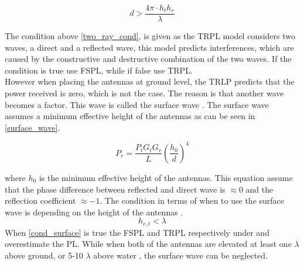 \begin{equation}
d > \frac{4\pi \cdot h_t h_r }{\lambda}
\label{two_ray_cond}
\end{equation}
 

The condition above \eqref{two_ray_cond}, is given as the TRPL model considers two waves, a direct and a reflected wave, this model predicts interferences, which are caused by the constructive and destructive combination of the two waves. If the condition is true use FSPL, while if false use TRPL.   %
\\










However when placing the antennas at ground level, the TRLP predicts that the power received is zero, which is not the case.
The reason is that another wave becomes a factor. This wave is called the surface wave \cite{Chong}. The surface wave assumes a minimum effective height of the antennas as can be seen in \eqref{surface_wave}. 

\begin{equation}
P_r=\frac{P_t G_t G_r }{L}\left(\frac{h_0}{d}\right)^4
\label{surface_wave}
\end{equation}

where $h_0$ is the minimum effective height of the antennas.  This equation assume that the phase difference between reflected and direct wave is $\approx 0$ and the reflection coefficient $\approx -1$. The condition in terms of when to use the surface wave is depending on the height of the antennas \cite{Chong}.
\begin{equation}
h_{r,t} < \lambda
\label{cond_surface}
\end{equation}
When \eqref{cond_surface} is true the FSPL and TRPL respectively under and overestimate the PL.
While when both of the antennas are elevated at least one $\lambda$ above ground, or 5-10 $\lambda$ above water \cite{Chong}, the surface wave can be neglected. 
